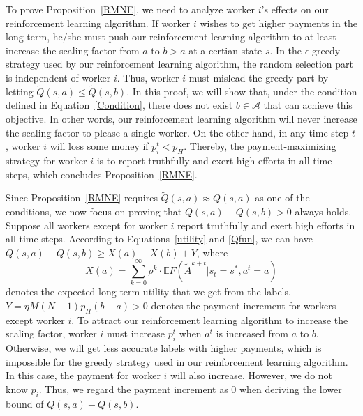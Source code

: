 \documentclass{article}
\begin{document}
To prove Proposition~\ref{RMNE}, we need to analyze worker $i$'s effects on our reinforcement learning algorithm.
If worker $i$ wishes to get higher payments in the long term, he/she must push our reinforcement learning algorithm to at least increase the scaling factor from $a$ to $b>a$ at a certian state $s$.
In the $\epsilon$-greedy strategy used by our reinforcement learning algorithm, the random selection part is independent of worker $i$.
Thus, worker $i$ must mislead the greedy part by letting $\tilde{Q}(s,a)\leq \tilde{Q}(s,b)$.
In this proof, we will show that, under the condition defined in Equation~\ref{Condition}, there does not exist $b\in \mathcal{A}$ that can achieve this objective.
In other words, our reinforcement learning algorithm will never increase the scaling factor to please a single worker.
On the other hand, in any time step $t$, worker $i$ will loss some money if $p_i^t<p_H$.
Thereby, the payment-maximizing strategy for worker $i$ is to report truthfully and exert high efforts in all time steps, which concludes Proposition~\ref{RMNE}.

Since Proposition~\ref{RMNE} requires $\tilde{Q}(s,a)\approx Q(s,a)$ as one of the conditions, we now focus on proving that $Q(s,a)- Q(s,b) >0$ always holds.
Suppose all workers except for worker $i$ report truthfully and exert high efforts in all time steps.
According to Equations~\ref{utility} and \ref{Qfun}, we can have $Q(s,a)- Q(s,b) \geq  X(a)-X(b) + Y$, where 
\begin{equation}
X(a)={\sum}_{k=0}^{\infty}\rho^{k}\cdot \mathbb{E}F(\tilde{A}^{k+t}|s_t= s^{*}, a^t=a)
\end{equation}
denotes the expected long-term utility that we get from the labels.
$Y= \eta M(N-1)p_H (b-a)>0$ denotes the payment increment for workers except worker $i$.
To attract our reinforcement learning algorithm to increase the scaling factor, worker $i$ must increase $p_i^t$ when $a^t$ is increased from $a$ to $b$.
Otherwise, we will get less accurate labels with higher payments, which is impossible for the greedy strategy used in our reinforcement learning algorithm.
In this case, the payment for worker $i$ will also increase.
However, we do not know $p_i$. Thus, we regard the payment increment as $0$ when deriving the lower bound of $Q(s,a)- Q(s,b)$.
\end{document}
